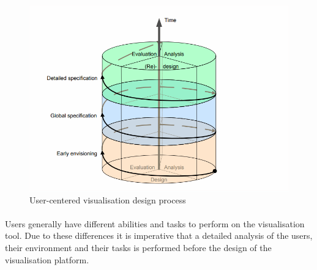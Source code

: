 \paragraph{}
\begin{figure}[b]
	\centering
	\includegraphics[width=0.7\linewidth]{img1}
	\caption{User-centered visualisation design process\cite{Abras04user-centereddesign}}
	\label{fig:img1}
\end{figure}

\paragraph{}
Users generally have different abilities and tasks to perform on the visualisation tool. Due to these differences it is imperative that a detailed analysis of the users, their environment and their tasks is performed before the design of the visualisation platform.

